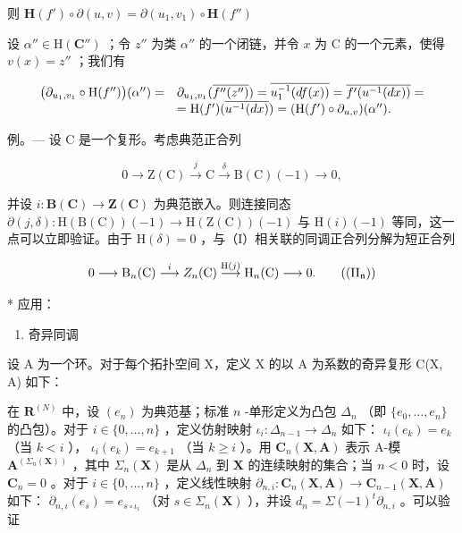 则 \(\mathbf{H}(f')\circ \partial (u,v) = \partial (u_1,v_1)\circ \mathbf{H}(f'')\)

设 \(\alpha'' \in \mathrm{H}(\mathbf{C}'')\) ；令 \(z''\) 为类 \(\alpha''\) 的一个闭链，并令 \(x\) 为 C 的一个元素，使得 \(v(x) = z''\) ；我们有

\[
\begin{array}{r l} \big (\partial_ {u _ {1}, v _ {1}} \circ \mathrm{H} (f ^ {\prime \prime}) \big) (\alpha^ {\prime \prime}) = & \partial_ {u _ {1}, v _ {1}} (\overline {{f ^ {\prime \prime} (z ^ {\prime \prime})}}) = \overline {{u _ {1} ^ {- 1} (d f (x))}} = \overline {{f ^ {\prime} (u ^ {- 1} (d x))}} = \\ & = \mathrm{H} (f ^ {\prime}) (\overline {{u ^ {- 1} (d x)}}) = (\mathrm{H} (f ^ {\prime}) \circ \partial_ {u, v}) (\alpha^ {\prime \prime}). \end{array}
\]

例。— 设 C 是一个复形。考虑典范正合列

\[
0 \longrightarrow \mathrm{Z} (\mathrm{C}) \stackrel {j} {\longrightarrow} \mathrm{C} \stackrel {\delta} {\longrightarrow} \mathrm{B} (\mathrm{C}) (- 1) \longrightarrow 0,\tag{I}
\]

并设 \(i: \mathbf{B}(\mathbf{C}) \to \mathbf{Z}(\mathbf{C})\) 为典范嵌入。则连接同态 \(\partial(j, \delta): \mathrm{H}(\mathrm{B}(\mathrm{C})) (-1) \to \mathrm{H}(\mathrm{Z}(\mathrm{C})) (-1)\) 与 \(\mathrm{H}(i) (-1)\) 等同，这一点可以立即验证。由于 \(\mathrm{H}(\delta) = 0\) ，与（I）相关联的同调正合列分解为短正合列

\[
0 \longrightarrow \mathrm{B} _ {n} (\mathrm{C}) \stackrel {i} {\longrightarrow} Z _ {n} (\mathrm{C}) \stackrel {\mathrm{H} (j)} {\longrightarrow} \mathrm{H} _ {n} (\mathrm{C}) \longrightarrow 0.\tag{\((\mathrm{II}_{\mathfrak{n}})\)}
\]

* 应用：

\begin{enumerate}
\def\labelenumi{\arabic{enumi})}
\tightlist
\item
  奇异同调
\end{enumerate}

设 A 为一个环。对于每个拓扑空间 X，定义 X 的以 A 为系数的奇异复形 C(X, A) 如下：

在 \(\mathbf{R}^{(N)}\) 中，设 \((e_n)\) 为典范基；标准 \(n\) -单形定义为凸包 \(\Delta_n\) （即 \(\{e_0, \ldots, e_n\}\) 的凸包）。对于 \(i \in \{0, \ldots, n\}\) ，定义仿射映射 \(\iota_i: \Delta_{n-1} \to \Delta_n\) 如下： \(\iota_i(e_k) = e_k\) （当 \(k < i\) ）， \(\iota_i(e_k) = e_{k+1}\) （当 \(k \geqslant i\) ）。用 \(\mathbf{C}_n(\mathbf{X}, \mathbf{A})\) 表示 A-模 \(\mathbf{A}^{(\Sigma_n(\mathbf{X}))}\) ，其中 \(\Sigma_n(\mathbf{X})\) 是从 \(\Delta_n\) 到 \(\mathbf{X}\) 的连续映射的集合；当 \(n < 0\) 时，设 \(\mathbf{C}_n = 0\) 。对于 \(i \in \{0, \ldots, n\}\) ，定义线性映射 \(\partial_{n,i}: \mathbf{C}_n(\mathbf{X}, \mathbf{A}) \to \mathbf{C}_{n-1}(\mathbf{X}, \mathbf{A})\) 如下： \(\partial_{n,i}(e_s) = e_{s \circ \iota_i}\) （对 \(s \in \Sigma_n(\mathbf{X})\) ），并设 \(d_n = \Sigma (-1)^t \partial_{n,i}\) 。可以验证

